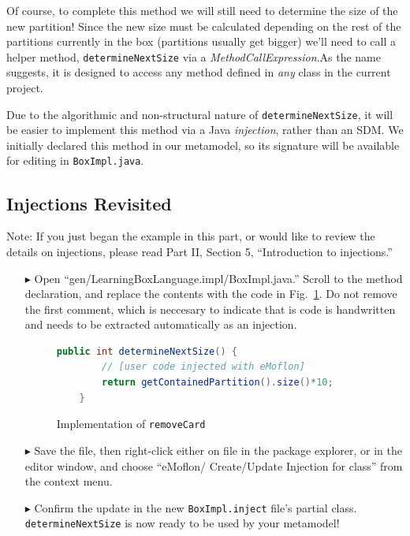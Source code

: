 Of course, to complete this method we will still need to determine the size of the new partition! Since the new size must be calculated depending on the
rest of the partitions currently in the box (partitions usually get bigger) we'll need to call a helper method, \texttt{determineNextSize} via a
\emph{MethodCallExpression}.As the name suggests, it is designed to access any method defined in \emph{any} class in the current project.

Due to the algorithmic and non-structural nature of \texttt{determineNextSize}, it will be easier to implement this method via a Java \emph{injection}, rather
than an SDM. We initially declared this method in our metamodel, so its signature will be available for editing in \texttt{BoxImpl.java}.

\subsection{Injections Revisited}
\genHeader

Note: If you just began the example in this part, or would like to review the details on injections, please read Part II, Section 5, ``Introduction to
injections.''

\begin{itemize}

\item[$\blacktriangleright$] Open ``gen/LearningBoxLanguage.impl/BoxImpl.java.'' Scroll to the method declaration, and
replace the contents with the code in Fig.~\ref{code:determineNextSize_impl}. Do not remove the first comment, which is neccesary to indicate that is code is
handwritten and needs to be extracted automatically as an injection.

\begin{figure}[htbp]
        \centering
        \begin{lstlisting}[language=Java, keywordstyle={\bfseries\color{purple}}, backgroundcolor=\color{white}]
    public int determineNextSize() {
    	// [user code injected with eMoflon]
        return getContainedPartition().size()*10;
    }
        \end{lstlisting}
        \caption{Implementation of \texttt{removeCard}}
        \label{code:determineNextSize_impl}
\end{figure}


\item[$\blacktriangleright$] Save the file, then right-click either on file in the package explorer, or in the editor window, and choose ``eMoflon/
Create/Update Injection for class'' from the context menu. 

\item[$\blacktriangleright$] Confirm the update in the new \texttt{BoxImpl.inject} file's partial class. \texttt{determineNextSize} is now ready to be used by
your metamodel!


\end{itemize}




